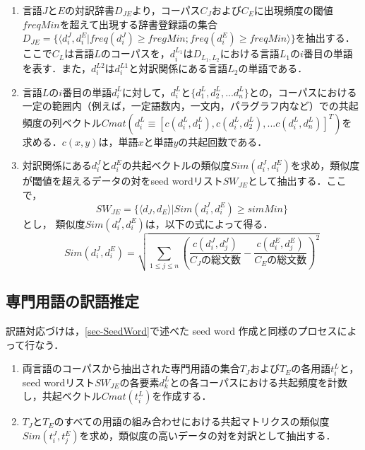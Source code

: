 \documentclass[japanese]{jnlp_1.3e}
\begin{document}
\begin{enumerate}
\item 言語$J$と$E$の対訳辞書$D_{\mathit{JE}}$より，コーパス$C_{J}$および$C_{E}$に出現頻度の閾値$\mathit{freqMin}$を超えて出現する辞書登録語の集合$D_{\mathit{JE}}=\{ \langle d^{J}_{i},d^{E}_{i} | \mathit{freq}(d^{J}_{i}) \geq \mathit{fregMin} ; \mathit{freq}(d^{E}_{i}) \geq \mathit{freqMin} \rangle \}$を抽出する．ここで$C_{L}$は言語$L$のコーパスを，$d^{L_{1 }}_{i}$は$D_{L_{1},L_{2}}$における言語$L_{1}$の$i$番目の単語を表す．また，$d^{L2}_{i}$は$d^{L1}_{i}$と対訳関係にある言語$L_{2}$の単語である．
\item 言語$L$の$i$番目の単語$d^{L}_{i}$に対して，$d^{L}_{i}$と$\{ d^{L}_{1},d^{L}_{2},...d^{L}_{n} \}$との，コーパスにおける一定の範囲内（例えば，一定語数内，一文内，パラグラフ内など）での共起頻度の列ベクトル$\mathit{Cmat}(d^{L}_{i} \equiv [ c(d^{L}_{i},d^{L}_{1}),c(d^{L}_{i},d^{L}_{2}),...c(d^{L}_{i},d^{L}_{n}) ]^{T})$を求める．$c(x,y)$は，単語$x$と単語$y$の共起回数である．
\item  対訳関係にある$d^{J}_{i}$と$d^{E}_{i}$の共起ベクトルの類似度$\mathit{Sim}(d^{J}_{i},d^{E}_{i})$を求め，類似度が閾値を超えるデータの対をseed wordリスト$SW_{\mathit{JE}}$として抽出する．ここで，
\[ \mathit{SW}_{\mathit{JE}} = \{ \langle d_{J},d_{E} \rangle | \mathit{Sim}(d^{J}_{i},d^{E}_{i}) \geq \mathit{simMin} \} \] とし，
類似度$\mathit{Sim}(d^{J}_{i},d^{E}_{i})$は，以下の式によって得る．
\pagebreak
\begin{equation}
\mathit{Sim}(d^{J}_{i},d^{E}_{i}) = \sqrt{ \sum_{1 \leq j \leq n} (\frac{c(d^{J}_{i},d^{J}_{j})}{C_{J}の総文数} - \frac{c(d^{E}_{i},d^{E}_{j})}{C_{E}の総文数})^2 }
\end{equation}

\end{enumerate}

\subsection{専門用語の訳語推定}

訳語対応づけは，\ref{sec-SeedWord}で述べた seed word 作成と同様のプロセスによって行なう．

\begin{enumerate}
\item 両言語のコーパスから抽出された専門用語の集合$T_{J}$および$T_{E}$の各用語$t^{L}_{i}$と，seed wordリスト$\mathit{SW}_{\mathit{JE}}$の各要素$d^{L}_{k}$との各コーパスにおける共起頻度を計数し，共起ベクトル$\mathit{Cmat}(t^{L}_{i})$を作成する．
\item $T_{J}$と$T_{E}$のすべての用語の組み合わせにおける共起マトリクスの類似度$\mathit{Sim}(t^{J}_{i},t^{E}_{j})$を求め，類似度の高いデータの対を対訳として抽出する．
\end{enumerate}
\end{document}
